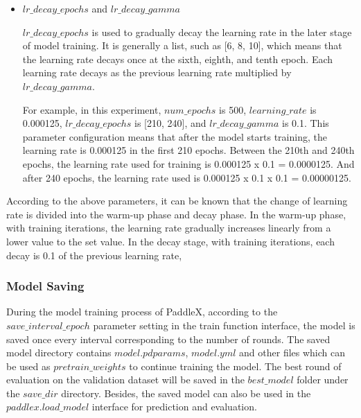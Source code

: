 \documentclass[journal,article,submit,moreauthors,pdftex]{Definitions/mdpi}
\begin{document}

\begin{itemize}
\item{$lr\_decay\_epochs$} and {$lr\_decay\_gamma$}

$lr\_decay\_epochs$ is used to gradually decay the learning rate in the later stage of model training. It is generally a list, such as [6, 8, 10], which means that the learning rate decays once at the sixth, eighth, and tenth epoch. Each learning rate decays as the previous learning rate multiplied by $lr\_decay\_gamma$.

For example, in this experiment, $num\_epochs$ is 500, $learning\_rate$ is 0.000125, $lr\_decay\_epochs$ is [210, 240], and $lr\_decay\_gamma$ is 0.1. This parameter configuration means that after the model starts training, the learning rate is 0.000125 in the first 210 epochs. Between the 210th and 240th epochs, the learning rate used for training is 0.000125 x 0.1 = 0.0000125. And after 240 epochs, the learning rate used is 0.000125 x 0.1 x 0.1 = 0.00000125.

\end{itemize}

According to the above parameters, it can be known that the change of learning rate is divided into the warm-up phase and decay phase. In the warm-up phase, with training iterations, the learning rate gradually increases linearly from a lower value to the set value. In the decay stage, with training iterations, each decay is 0.1 of the previous learning rate,

\subsubsection{Model Saving}
During the model training process of PaddleX, according to the $save\_interval\_epoch$ parameter setting in the train function interface, the model is saved once every interval corresponding to the number of rounds. The saved model directory contains $model.pdparams$, $model.yml$ and other files which can be used as $pretrain\_weights$ to continue training the model. The best round of evaluation on the validation dataset will be saved in the $best\_model$ folder under the $save\_dir$ directory. Besides, the saved model can also be used in the $paddlex.load\_model$ interface for prediction and evaluation.
\end{document}
